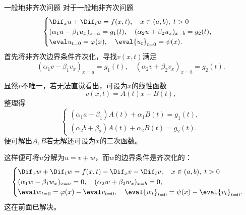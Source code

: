 \begin{method}{一般地非齐次问题}{}
	对于一般地非齐次问题
	\begin{align*}
		\begin{cases}
			\Dif_xu+\Dif_tu=f(x,t),\quad x\in(a,b),\;t>0\\
			(\alpha_1u-\beta_1u_x)_{x=a}=g_1(t),\quad(\alpha_2u+\beta_2u_x)_{x=b}=g_2(t),\\
			\eval u_{t=0}=\varphi(x),\quad\eval{u_t}_{t=0}=\psi(x).
		\end{cases}
	\end{align*}
	首先将非齐次边界条件齐次化，寻找$v(x,t)$满足 
	\[
		(\alpha_1v-\beta_1v_x)_{x=a}=g_1(t),\quad(\alpha_2v+\beta_2v_x)_{x=b}=g_2(t).
	\]
	
	显然$v$不唯一，若无法直觉看出，可设为$x$的线性函数
	\[
		v(x,t)=A(t)x+B(t),
	\]
	整理得
	\[
		\begin{cases}
			(\alpha_1a-\beta_1)A(t)+\alpha_1B(t)=g_1(t),\\
			(\alpha_2b+\beta_2)A(t)+\alpha_2B(t)=g_2(t).
		\end{cases}
	\]
	便可解出$A,B$若无解还可设为$x$的二次函数。
	
	这样便可将$u$分解为$u=v+w$，而$w$的边界条件是齐次化的：
	\begin{align*}
		\begin{cases}
			\Dif_xw+\Dif_tw=f(x,t)-\Dif_xv-\Dif_tv,\quad x\in(a,b),\;t>0\\
			(\alpha_1w-\beta_1w_x)_{x=a}=0,\quad(\alpha_2w+\beta_2w_x)_{x=b}=0,\\
			\eval w_{t=0}=\varphi(x)-\eval v_{t=0},\quad\eval{w_t}_{t=0}=\psi(x)-\eval{v_t}_{t=0}.
		\end{cases}
	\end{align*}
	这在前面已解决。
\end{method}


